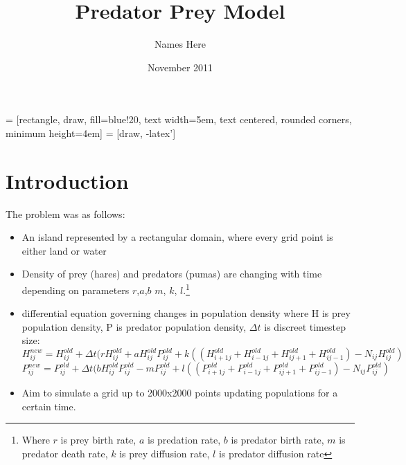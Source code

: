 \documentclass[11pt]{report}
\title{Predator Prey Model\let\thefootnote\relax\footnotetext{When writing this report, a lot of emphasis was put on interactivity, so, a reader would benefit from reading an electronic version (PDF) rather than a paper one}}
\author{Names Here}
\date{November 2011}
\begin{document}
\usetikzlibrary{shapes,arrows}


 = [rectangle, draw, fill=blue!20, 
    text width=5em, text centered, rounded corners, minimum height=4em]
 = [draw, -latex']

\maketitle



\tableofcontents
\thispagestyle{empty}

\chapter{Introduction}
\setcounter{page}{1}

The problem was as follows:
\begin{itemize}
\item An island represented by a rectangular domain, where every grid point is either land or water
\item Density of prey (hares) and predators (pumas) are changing with time depending on parameters $r$,$a$,$b$ $m$, $k$, $l$.\footnote{Where $r$ is prey birth rate, $a$ is predation rate, $b$ is predator birth rate, $m$ is predator death rate, $k$ is prey diffusion rate, $l$ is predator diffusion rate}
\item differential equation governing changes in population density where H is prey population density, P is predator population density, ${\Delta}t$ is discreet timestep size:
\begin{equation*}
H_{ij}^{new}=H_{ij}^{old} + {\Delta}t(rH_{ij}^{old}+aH_{ij}^{old}P_{ij}^{old} + k((H_{i+1j}^{old} + H_{i-1j}^{old} + H_{ij+1}^{old} + H_{ij-1}^{old})-N_{ij}H_{ij}^{old})
\end{equation*}
\begin{equation*}
P_{ij}^{new}=P_{ij}^{old} + {\Delta}t(bH_{ij}^{old}P_{ij}^{old}-mP_{ij}^{old} + l((P_{i+1j}^{old} + P_{i-1j}^{old} + P_{ij+1}^{old} + P_{ij-1}^{old})-N_{ij}P_{ij}^{old})
\end{equation*}

\item Aim to simulate a grid up to 2000x2000 points updating populations for a certain time.
\end{itemize}
\end{document}
